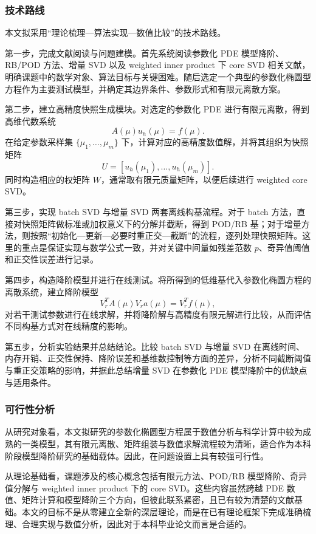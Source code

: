 \subsubsection{技术路线}

本文拟采用“理论梳理—算法实现—数值比较”的技术路线。

第一步，完成文献阅读与问题建模。首先系统阅读参数化 PDE 模型降阶、RB/POD 方法、增量 SVD 以及 weighted inner product 下 core SVD 相关文献，明确课题中的数学对象、算法目标与关键困难。随后选定一个典型的参数化椭圆型方程作为主要测试模型，并确定其边界条件、参数形式和有限元离散方案。

第二步，建立高精度快照生成模块。对选定的参数化 PDE 进行有限元离散，得到高维代数系统
\[
A(\mu)u_h(\mu)=f(\mu).
\]
在给定参数采样集 $\{\mu_1,\dots,\mu_m\}$ 下，计算对应的高精度数值解，并将其组织为快照矩阵
\[
U=[u_h(\mu_1),\dots,u_h(\mu_m)].
\]
同时构造相应的权矩阵 $W$，通常取有限元质量矩阵，以便后续进行 weighted core SVD。

第三步，实现 batch SVD 与增量 SVD 两套离线构基流程。对于 batch 方法，直接对快照矩阵做标准或加权意义下的分解并截断，得到 POD/RB 基；对于增量方法，则按照“初始化—更新—必要时重正交—截断”的流程，逐列处理快照矩阵。这里的重点是保证实现与数学公式一致，并对关键中间量如残差范数 $p$、奇异值阈值和正交性误差进行记录。

第四步，构造降阶模型并进行在线测试。将所得到的低维基代入参数化椭圆方程的离散系统，建立降阶模型
\[
V_r^T A(\mu)V_r a(\mu)=V_r^T f(\mu),
\]
对若干测试参数进行在线求解，并将降阶解与高精度有限元解进行比较，从而评估不同构基方式对在线精度的影响。

第五步，分析实验结果并总结结论。比较 batch SVD 与增量 SVD 在离线时间、内存开销、正交性保持、降阶误差和基维数控制等方面的差异，分析不同截断阈值与重正交策略的影响，并据此总结增量 SVD 在参数化 PDE 模型降阶中的优缺点与适用条件。

\subsubsection{可行性分析}

从研究对象看，本文拟研究的参数化椭圆型方程属于数值分析与科学计算中较为成熟的一类模型，其有限元离散、矩阵组装与数值求解流程较为清晰，适合作为本科阶段模型降阶研究的基础载体。因此，在问题设置上具有较强可行性。

从理论基础看，课题涉及的核心概念包括有限元方法、POD/RB 模型降阶、奇异值分解与 weighted inner product 下的 core SVD。这些内容虽然跨越 PDE 数值、矩阵计算和模型降阶三个方向，但彼此联系紧密，且已有较为清楚的文献基础。本文的目标不是从零建立全新的深层理论，而是在已有理论框架下完成准确梳理、合理实现与数值分析，因此对于本科毕业论文而言是合适的。

